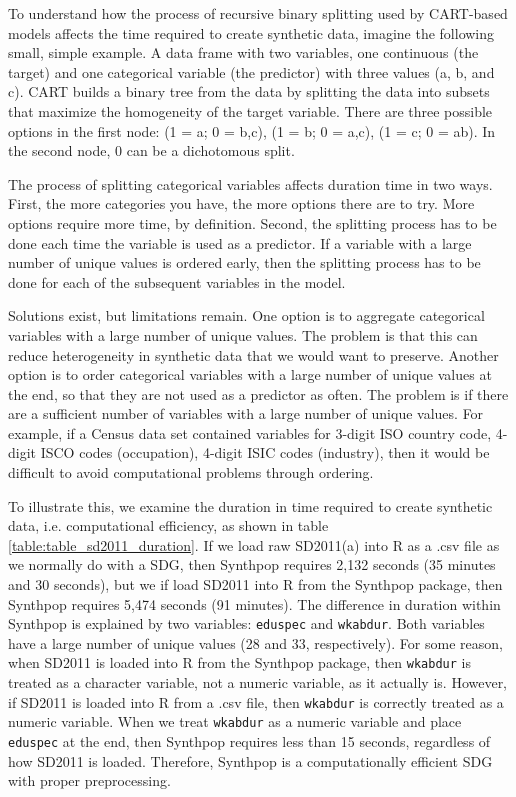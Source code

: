 \documentclass[runningheads]{llncs}
\begin{document}
To understand how the process of recursive binary splitting used by CART-based models affects the time required to create synthetic data, imagine the following small, simple example.  A data frame with two variables, one continuous (the target) and one categorical variable (the predictor) with three values (a, b, and c).  CART builds a binary tree from the data by splitting the data into subsets that maximize the homogeneity of the target variable.  There are three possible options in the first node: (1 = a; 0 = b,c), (1 = b; 0 = a,c), (1 = c; 0 = ab).  In the second node, 0 can be a dichotomous split.  

The process of splitting categorical variables affects duration time in two ways.  First, the more categories you have, the more options there are to try.  More options require more time, by definition.  Second, the splitting process has to be done each time the variable is used as a predictor.  If a variable with a large number of unique values is ordered early, then the splitting process has to be done for each of the subsequent variables in the model.  

Solutions exist, but limitations remain.  One option is to aggregate categorical variables with a large number of unique values.  The problem is that this can reduce heterogeneity in synthetic data that we would want to preserve.  Another option is to order categorical variables with a large number of unique values at the end, so that they are not used as a predictor as often.  The problem is if there are a sufficient number of variables with a large number of unique values.  For example, if a Census data set contained variables for 3-digit ISO country code, 4-digit ISCO codes (occupation), 4-digit ISIC codes (industry), then it would be difficult to avoid computational problems through ordering.  

To illustrate this, we examine the duration in time required to create synthetic data, i.e. computational efficiency, as shown in table \ref{table:table_sd2011_duration}.  If we load raw SD2011(a) into \textsf{R} as a .csv file as we normally do with a SDG, then Synthpop requires 2,132 seconds (35 minutes and 30 seconds), but we if load SD2011 into \textsf{R} from the Synthpop package, then Synthpop requires 5,474 seconds (91 minutes).  The difference in duration within Synthpop is explained by two variables: \texttt{eduspec} and \texttt{wkabdur}.  Both variables have a large number of unique values (28 and 33, respectively). For some reason, when SD2011 is loaded into \textsf{R} from the Synthpop package, then \texttt{wkabdur} is treated as a character variable, not a numeric variable, as it actually is.  However, if SD2011 is loaded into \textsf{R} from a .csv file, then \texttt{wkabdur} is correctly treated as a numeric variable.  When we treat \texttt{wkabdur} as a numeric variable and place \texttt{eduspec} at the end, then Synthpop requires less than 15 seconds, regardless of how SD2011 is loaded.  Therefore, Synthpop is a computationally efficient SDG with proper preprocessing.
\end{document}
